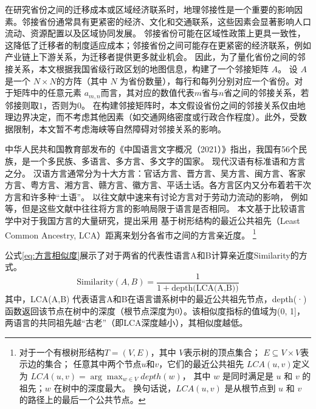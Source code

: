\documentclass[
  a4paper,
  zihao=-4,
  fontset=mac,
  AutoFakeBold,
  AutoFakeSlant,
  oneside]{ctexbook}
\let\oldfootnote\footnote
\renewcommand{\footnote}[1]{%
  \oldfootnote{\setstretch{1.5}#1}%
}
\begin{document}
在研究省份之间的迁移成本或区域经济联系时，地理邻接性是一个重要的影响因素。邻接省份通常具有更紧密的经济、文化和交通联系，这些因素会显著影响人口流动、资源配置以及区域协同发展。
邻接省份可能在区域性政策上更具一致性，这降低了迁移者的制度适应成本；邻接省份之间可能存在更紧密的经济联系，例如产业链上下游关系，为迁移者提供更多就业机会。
因此，为了量化省份之间的邻接关系，本文根据我国省级行政区划的地图信息，构建了一个邻接矩阵 $A$。
设 $A$ 是一个 $N \times N$的方阵（其中 $N$ 为省份数量），每行和每列分别对应一个省份。对于矩阵中的任意元素 $a_{m,n}$而言，其对应的数值代表$m$省与$n$省之间的邻接关系，若邻接则取$1$，否则为$0$。
在构建邻接矩阵时，本文假设省份之间的邻接关系仅由地理边界决定，而不考虑其他因素（如交通网络密度或行政合作程度）。此外，受数据限制，本文暂不考虑海峡等自然障碍对邻接关系的影响。


中华人民共和国教育部发布的《中国语言文字概况（2021）》指出，我国有56个民族，是一个多民族、多语言、多方言、多文字的国家。
现代汉语有标准语和方言之分。
汉语方言通常分为十大方言：官话方言、晋方言、吴方言、闽方言、客家方言、粤方言、湘方言、赣方言、徽方言、平话土话。各方言区内又分布着若干次方言和许多种“土语”。
以往文献中速来有讨论方言对于劳动力流动的影响，
例如\textcite{HuangZongYeFangYanDuiShengJiRenKouQianYiDeYingXiang2020,LiQinFangYanPuTongHuaYuZhongGuoLaoDongLiQuYuLiuDong2014}等，但是这些文献中往往将方言的影响局限于语言是否相同。
本文基于比较语言学中对于我国方言的大量研究，提出采用
基于树形结构的最近公共祖先（Least Common Ancestry, LCA）距离来划分各省市之间的方言亲近度。
\footnote{
对于一个有根树形结构$T=(V,E)$，其中
$V$表示树的顶点集合；
$E\subseteq V \times V$表示边的集合；
任意其中两个节点$u$和$v$，它们的最近公共祖先 $LCA(u,v) $定义为
$LCA(u,v)=\arg \max_{w\in V} depth(w)$，
其中 $w$ 是同时满足是 $u$ 和 $v$ 的祖先；$w$ 在树中的深度最大。
换句话说，$LCA(u,v)$ 是从根节点到 $u$ 和 $v$ 的路径上的最后一个公共节点。
}
公式\ref{eq:方言相似度}展示了对于两省的代表性语言A和B计算亲近度Similarity的方式。
\begin{equation} 
\label{eq:方言相似度} 
\text{Similarity}(A,B) = \frac{1}{1+\text{depth(LCA(A,B))}} 
\end{equation}
其中，LCA(A,B) 代表语言A和B在语言谱系树中的最近公共祖先节点，depth(·) 函数返回该节点在树中的深度（根节点深度为0）。该相似度指标的值域为(0, 1]，两语言的共同祖先越“古老”（即LCA深度越小），其相似度越低。
\end{document}
